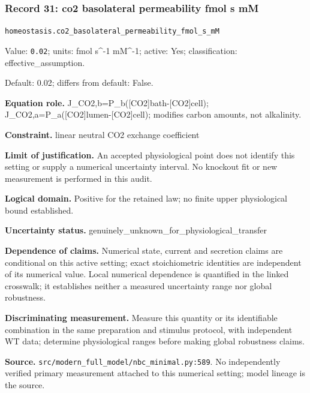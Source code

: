 \subsubsection*{Record 31: co2 basolateral permeability fmol s mM}
{\small \nolinkurl{homeostasis.co2_basolateral_permeability_fmol_s_mM}\par

Value: \texttt{0.02}; units: fmol s\textasciicircum{}-1 mM\textasciicircum{}-1; active: Yes; classification: effective\_assumption.\par

Default: 0.02; differs from default: False.\par

\textbf{Equation role.} J\_CO2,b=P\_b([CO2]bath-[CO2]cell); J\_CO2,a=P\_a([CO2]lumen-[CO2]cell); modifies carbon amounts, not alkalinity.\par

\textbf{Constraint.} linear neutral CO2 exchange coefficient\par

\textbf{Limit of justification.} An accepted physiological point does not identify this setting or supply a numerical uncertainty interval. No knockout fit or new measurement is performed in this audit.\par

\textbf{Logical domain.} Positive for the retained law; no finite upper physiological bound established.\par

\textbf{Uncertainty status.} genuinely\_unknown\_for\_physiological\_transfer\par

\textbf{Dependence of claims.} Numerical state, current and secretion claims are conditional on this active setting; exact stoichiometric identities are independent of its numerical value. Local numerical dependence is quantified in the linked crosswalk; it establishes neither a measured uncertainty range nor global robustness.\par

\textbf{Discriminating measurement.} Measure this quantity or its identifiable combination in the same preparation and stimulus protocol, with independent WT data; determine physiological ranges before making global robustness claims.\par

\textbf{Source.} \nolinkurl{src/modern_full_model/nbc_minimal.py:589}. No independently verified primary measurement attached to this numerical setting; model lineage is the source.\par}

